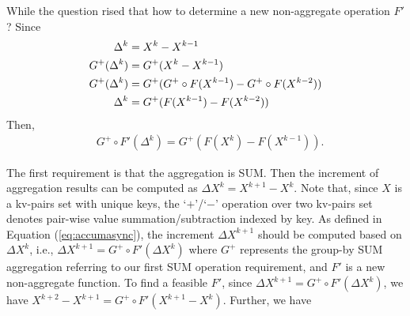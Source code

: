 {While the question rised that how to determine a new non-aggregate operation $F'$? Since
	\begin{equation}
	\label{eq:inferr}
	\begin{aligned}
	\Delta^k&=X^k-X^{k-1}\\
	G^+(\Delta^{k})&=G^+(X^k-X^{k-1})\\
	G^+(\Delta^{k})&=G^+(G^+\circ F(X^{k-1})-G^+\circ F(X^{k-2}))\\
	\Delta^{k}&=G^+(F(X^{k-1})-F(X^{k-2}))\notag
	\end{aligned}
	\end{equation}
	Then,
	\begin{equation}
	\label{eq:findf}
	\begin{aligned}
	&G^+\circ F'(\Delta^{k})=G^+(F(X^{k})-F(X^{k-1})).
	\end{aligned}
	\end{equation}
}

{\color{green}
	The first requirement is that the aggregation is SUM. Then the increment of aggregation results can be computed as $\Delta X^k=X^{k+1}-X^k$. Note that, since $X$ is a kv-pairs set with unique keys, the `$+$'/`$-$' operation over two kv-pairs set denotes pair-wise value summation/subtraction indexed by key. As defined in Equation (\ref{eq:accumasync}), the increment $\Delta X^{k+1}$ should be computed based on $\Delta X^k$, i.e., $\Delta X^{k+1}=G^{+}\circ F'(\Delta X^k)$ where $G^{+}$ represents the group-by SUM aggregation referring to our first SUM operation requirement, and $F'$ is a new non-aggregate function. To find a feasible $F'$, since $\Delta X^{k+1}=G^{+}\circ F'(\Delta X^k)$, we have $X^{k+2}-X^{k+1}=G^{+}\circ F'(X^{k+1}-X^k)$. Further, we have
}

